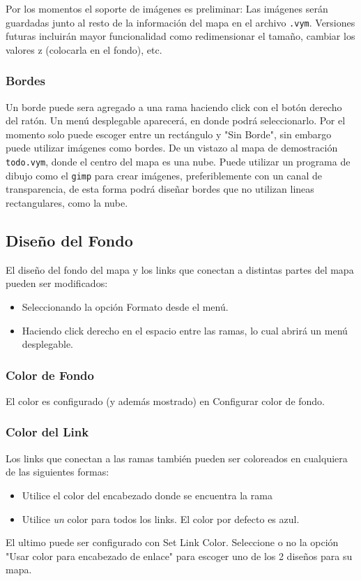 \documentclass{article}
\begin{document}
Por los momentos el soporte de im\'agenes es preliminar: Las im\'agenes ser\'an guardadas junto al resto de la informaci\'on del mapa en el archivo {\tt .vym}.
Versiones futuras incluir\'an mayor funcionalidad como redimensionar el tama\~no, cambiar los valores z (colocarla en el fondo), etc.

\subsubsection*{Bordes}
Un borde puede sera agregado a una rama haciendo click con el bot\'on derecho del rat\'on. Un men\'u desplegable aparecer\'a, en donde podr\'a seleccionarlo. Por el momento solo puede escoger entre un rect\'angulo y "Sin Borde", sin embargo puede utilizar im\'agenes como bordes. De un vistazo al mapa de demostraci\'on {\tt todo.vym}, donde el centro del mapa es una nube. Puede utilizar un programa de dibujo como el {\tt gimp} para crear im\'agenes, preferiblemente con un canal de transparencia, de esta forma podr\'a dise\~nar bordes que no utilizan lineas rectangulares, como la nube.

\subsection{Dise\~no del Fondo}
El dise\~no del fondo del mapa y los links que conectan a distintas partes del mapa pueden ser modificados:

\begin{itemize}
    \item Seleccionando la opci\'on Formato desde el men\'u.
    \item Haciendo click derecho en el espacio entre las ramas, lo cual abrir\'a un men\'u desplegable.
\end{itemize}

\subsubsection*{Color de Fondo}
El color es configurado (y adem\'as mostrado) en Configurar color de fondo.

\subsubsection*{Color del Link}
Los links que conectan  a las ramas tambi\'en pueden ser coloreados en cualquiera de las siguientes formas:
\begin{itemize}
    \item Utilice el color del encabezado donde se encuentra la rama
    \item Utilice {\em un} color para todos los links. El color por defecto es azul.
\end{itemize}
El ultimo puede ser configurado con Set Link Color. Seleccione o no la opci\'on "Usar color para encabezado de enlace" para escoger uno de los 2 dise\~nos para su mapa.
\end{document}
